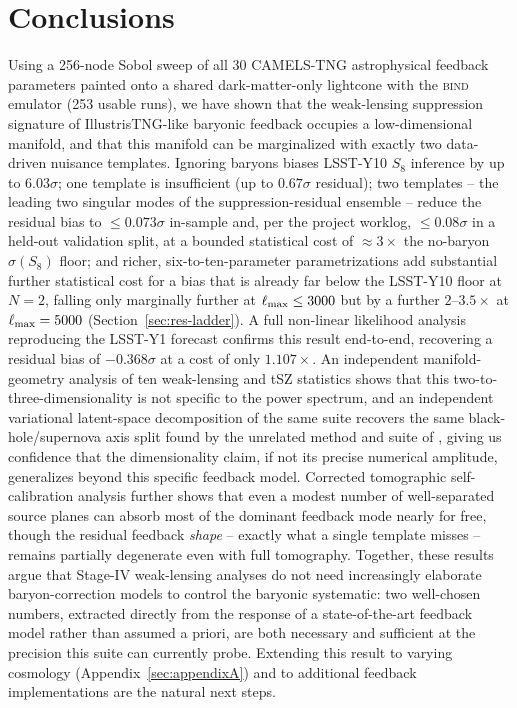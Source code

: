 \documentclass[11pt]{article}
\newcommand{\bind}{\textsc{bind}}
\begin{document}
\section{Conclusions}\label{sec:conclusions}

Using a 256-node Sobol sweep of all 30 CAMELS-TNG astrophysical feedback
parameters painted onto a shared dark-matter-only lightcone with the \bind{}
emulator (253 usable runs), we have shown that the weak-lensing suppression
signature of IllustrisTNG-like baryonic feedback occupies a low-dimensional
manifold, and that this manifold can be marginalized with exactly two
data-driven nuisance templates. Ignoring baryons biases LSST-Y10 $S_8$
inference by up to $6.03\sigma$; one template is insufficient (up to
$0.67\sigma$ residual); two templates -- the leading two singular modes of
the suppression-residual ensemble -- reduce the residual bias to
$\le0.073\sigma$ in-sample and, per the project worklog, $\le0.08\sigma$ in a
held-out validation split, at a bounded statistical cost of $\approx3\times$
the no-baryon $\sigma(S_8)$ floor; and richer, six-to-ten-parameter
parametrizations add substantial further statistical cost for a bias that is
already far below the LSST-Y10 floor at $N=2$, falling only marginally
further at $\ell_{\rm max}\le3000$ but by a further $2$--$3.5\times$ at
$\ell_{\rm max}=5000$ (Section~\ref{sec:res-ladder}). A full non-linear likelihood analysis reproducing the
\citet{robertson2026} LSST-Y1 forecast confirms this result end-to-end,
recovering a residual bias of $-0.368\sigma$ at a cost of only $1.107\times$. %
An independent manifold-geometry analysis of ten weak-lensing and tSZ
statistics shows that this two-to-three-dimensionality is not specific to
the power spectrum, and an independent variational latent-space
decomposition of the same suite \citep[Paper~III]{bindIII} recovers the same
black-hole/supernova axis split found by the unrelated method and suite of
\citet{lin2026}, giving us confidence that the dimensionality claim, if not
its precise numerical amplitude, generalizes beyond this specific feedback
model. Corrected tomographic self-calibration analysis further shows that
even a modest number of well-separated source planes can absorb most of the
dominant feedback mode nearly for free, though the residual feedback
\emph{shape} -- exactly what a single template misses -- remains partially
degenerate even with full tomography. Together, these results argue that
Stage-IV weak-lensing analyses do not need increasingly elaborate
baryon-correction models to control the baryonic systematic: two
well-chosen numbers, extracted directly from the response of a
state-of-the-art feedback model rather than assumed a priori, are both
necessary and sufficient at the precision this suite can currently probe.
Extending this result to varying cosmology (Appendix~\ref{sec:appendixA})
and to additional feedback implementations are the natural next steps.
\end{document}
